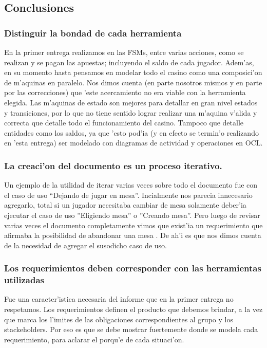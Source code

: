 \subsection{Conclusiones}

\subsubsection{Distinguir la bondad de cada herramienta}
En la primer entrega realizamos en las FSMs, entre varias acciones, como se realizan y se pagan las apuestas; incluyendo el saldo de cada jugador. Adem'as, en su momento hasta pensamos en modelar todo el casino como una composici'on de m'aquinas en paralelo. Nos dimos cuenta (en parte nosotros mismos y en parte por las correcciones) que 'este acercamiento no era viable con la herramienta elegida. Las m'aquinas de estado son mejores para detallar en gran nivel estados y transiciones, por lo que no tiene sentido lograr realizar una m'aquina v'alida y correcta que detalle todo el funcionamiento del casino. Tampoco que detalle entidades como los saldos, ya que 'esto pod'ia (y en efecto se termin'o realizando en 'esta entrega) ser modelado con diagramas de actividad y operaciones en OCL.

\subsubsection{La creaci'on del documento es un proceso iterativo.}
Un ejemplo de la utilidad de iterar varias veces sobre todo el documento fue con el caso de uso ``Dejando de jugar en mesa''. Incialmente nos parecia innecesario agregarlo, total si un jugador necesitaba cambiar de mesa solamente deber'ia ejecutar el caso de uso ''Eligiendo mesa'' o ''Creando mesa''. Pero luego de revisar varias veces el documento completamente vimos que exist'ia un requerimiento que afirmaba la posibilidad de abandonar una mesa . De ah'i es que nos dimos cuenta de la necesidad de agregar el susodicho caso de uso.

\subsubsection{Los requerimientos deben corresponder con las herramientas utilizadas}
Fue una caracter'istica necesaria del informe que en la primer entrega no respetamos. Los requerimientos definen el producto que debemos brindar, a la vez que marca los l'imites de las obligaciones correspondientes al grupo y los stackeholders. Por eso es que se debe mostrar fuertemente donde se modela cada requerimiento, para aclarar el porqu'e de cada situaci'on.

